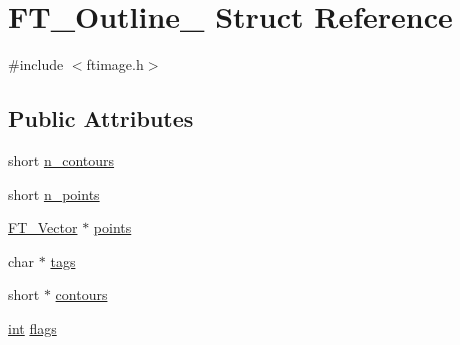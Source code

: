 \hypertarget{struct_f_t___outline__}{\section{F\-T\-\_\-\-Outline\-\_\- Struct Reference}
\label{struct_f_t___outline__}
}


{\ttfamily \#include $<$ftimage.\-h$>$}

\subsection*{Public Attributes}
\begin{DoxyCompactItemize}
\item 
short \hyperlink{struct_f_t___outline___a0313ba9c2c51f10e6b7d7ef97bd946e2}{n\-\_\-contours}
\item 
short \hyperlink{struct_f_t___outline___a7ebcf3c33231af88655534d1ac02b66e}{n\-\_\-points}
\item 
\hyperlink{ftimage_8h_ab158b5a7e422acb1968af95db786d018}{F\-T\-\_\-\-Vector} $\ast$ \hyperlink{struct_f_t___outline___a4871896a2f38bdab947e30a7cf6bca04}{points}
\item 
char $\ast$ \hyperlink{struct_f_t___outline___ac84ca66907361e1f49ec11c14720087a}{tags}
\item 
short $\ast$ \hyperlink{struct_f_t___outline___a218fdea14003061142ac1045ac50affa}{contours}
\item 
\hyperlink{wglew_8h_a500a82aecba06f4550f6849b8099ca21}{int} \hyperlink{struct_f_t___outline___a149765f0be0eab4fc82410cf853964bf}{flags}
\end{DoxyCompactItemize}



